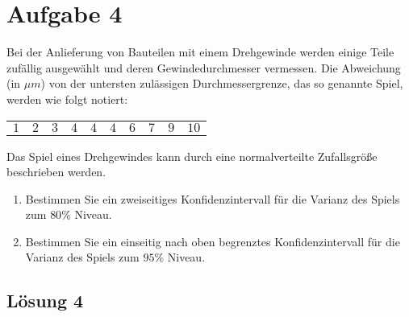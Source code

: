 \documentclass[main.tex]{subfiles}
\begin{document}
\section{Aufgabe 4}
Bei der Anlieferung von Bauteilen mit einem Drehgewinde werden einige Teile zufällig ausgewählt und deren Gewindedurchmesser vermessen. Die Abweichung (in $\mu m$) von der untersten zulässigen Durchmessergrenze, das so genannte Spiel, werden wie folgt notiert:
\begin{center}
\begin{tabular}{cccccccccc}
$1$ & $2$ & $3$ & $4$ & $4$ & $4$ & $6$ & $7$ & $9$ & $10$
\end{tabular}
\end{center}
Das Spiel eines Drehgewindes kann durch eine normalverteilte Zufallsgröße beschrieben werden.
\begin{enumerate}
\item Bestimmen Sie ein zweiseitiges Konfidenzintervall für die Varianz des Spiels zum $80\%$ Niveau.
\item Bestimmen Sie ein einseitig nach oben begrenztes Konfidenzintervall für die Varianz des Spiels zum $95$\% 
Niveau.
\end{enumerate}

\subsection{Lösung 4}
\end{document}
